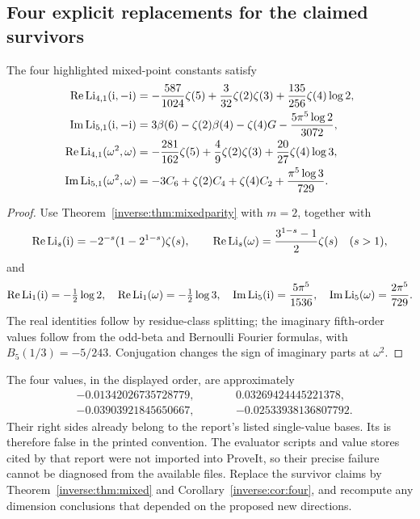 \subsection{Four explicit replacements for the claimed survivors}

\begin{corollary}\label{inverse:cor:four}
The four highlighted mixed-point constants satisfy
\begin{align}
\operatorname{Re}\operatorname{Li}_{4,1}(\mathrm{i},-\mathrm{i})
&=-\frac{587}{1024}\zeta(5)
 +\frac3{32}\zeta(2)\zeta(3)
 +\frac{135}{256}\zeta(4)\log2,
\label{inverse:eq:gaussian4}\\
\operatorname{Im}\operatorname{Li}_{5,1}(\mathrm{i},-\mathrm{i})
&=3\beta(6)-\zeta(2)\beta(4)-\zeta(4)G
 -\frac{5\pi^5\log2}{3072},
\label{inverse:eq:gaussian5}\\
\operatorname{Re}\operatorname{Li}_{4,1}(\omega^2,\omega)
&=-\frac{281}{162}\zeta(5)
 +\frac49\zeta(2)\zeta(3)
 +\frac{20}{27}\zeta(4)\log3,
\label{inverse:eq:eisenstein4}\\
\operatorname{Im}\operatorname{Li}_{5,1}(\omega^2,\omega)
&=-3C_6+\zeta(2)C_4+\zeta(4)C_2
 +\frac{\pi^5\log3}{729}.
\label{inverse:eq:eisenstein5}
\end{align}
\end{corollary}
\begin{proof}
Use Theorem~\ref{inverse:thm:mixedparity} with \(m=2\), together with
\[
\operatorname{Re}\operatorname{Li}_s(\mathrm{i})=-2^{-s}(1-2^{1-s})\zeta(s),\qquad
\operatorname{Re}\operatorname{Li}_s(\omega)=\frac{3^{1-s}-1}{2}\zeta(s)\quad(s>1),
\]
and
\[
\operatorname{Re}\operatorname{Li}_1(\mathrm{i})=-\tfrac12\log2,\quad
\operatorname{Re}\operatorname{Li}_1(\omega)=-\tfrac12\log3,\quad
\operatorname{Im}\operatorname{Li}_5(\mathrm{i})=\frac{5\pi^5}{1536},\quad
\operatorname{Im}\operatorname{Li}_5(\omega)=\frac{2\pi^5}{729}.
\]
The real identities follow by residue-class splitting; the imaginary
fifth-order values follow from the odd-beta and Bernoulli Fourier
formulas, with \(B_5(1/3)=-5/243\).
Conjugation changes the sign of imaginary parts at \(\omega^2\).
\end{proof}

The four values, in the displayed order, are approximately
\[
\begin{aligned}
&-0.01342026735728779,\qquad && 0.03269424445221378,\\
&-0.03903921845650667,\qquad &&-0.02533938136807792.
\end{aligned}
\]
Their right sides already belong to the report's listed single-value
bases. Its  is therefore false in the printed
convention. The evaluator scripts and value stores cited by that report
were not imported into ProveIt, so their precise failure cannot be
diagnosed from the available files. Replace the survivor claims by
Theorem~\ref{inverse:thm:mixed} and Corollary~\ref{inverse:cor:four}, and recompute any
dimension conclusions that depended on the proposed new directions.

